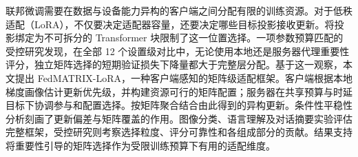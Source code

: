 联邦微调需要在数据与设备能力异构的客户端之间分配有限的训练资源。对于低秩适配（LoRA），不仅要决定适配器容量，还要决定哪些目标投影接收更新。将投影绑定为不可拆分的 Transformer 块限制了这一位置选择。一项参数预算匹配的受控研究发现，在全部 12 个设置级对比中，无论使用本地还是服务器代理重要性评分，独立矩阵选择的短期验证损失下降量都大于完整层分配。基于这一观察，本文提出 FedMATRIX-LoRA，一种客户端感知的矩阵级适配框架。客户端根据本地梯度画像估计更新优先级，并构建资源可行的矩阵配置；服务器在共享预算与时延目标下协调参与和配置选择。按矩阵聚合结合由此得到的异构更新。条件性平稳性分析刻画了更新偏差与矩阵覆盖的作用。图像分类、语言理解及对话摘要实验评估完整框架，受控研究则考察选择粒度、评分可靠性和各组成部分的贡献。结果支持将重要性引导的矩阵选择作为受限训练预算下有用的适配维度。
